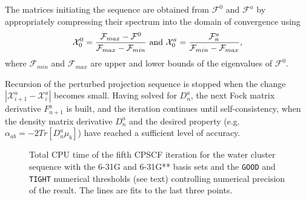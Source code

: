 \documentclass[prl,aps,twocolumn,showpacs,twocolumngrid,superbib]{revtex4}
\begin{document}
The matrices initiating the sequence are obtained from $\mathcal{F}^0$
and  $\mathcal{F}^a$ by appropriately 
compressing their spectrum into the domain of convergence \cite{ANiklasson02A} using
\begin{equation}
\mathcal{X}^0_{0}=\frac{\mathcal{F}_{max}-\mathcal{F}^0}{\mathcal{F}_{max}-\mathcal{F}_{min}}~{\rm and}~
\mathcal{X}^a_{0}=\frac{\mathcal{F}^a_{n}}{\mathcal{F}_{min}-\mathcal{F}_{max}},
\end{equation}
where $\mathcal{F}_{min}$ and $\mathcal{F}_{max}$ are upper and lower bounds of the eigenvalues of $\mathcal{F}^0$.

Recursion of the perturbed projection sequence is stopped when the change 
$\left| \mathcal{X}^a_{i+1}-\mathcal{X}^a_i \right|$ becomes small. Having solved for $D^a_n$, 
the next Fock matrix derivative $F^a_{n+1}$ is built, and the iteration continues until 
self-consistency, when the density matrix derivative $D^a_n$ and the desired property 
(e.g. $\alpha_{ab}=-2Tr[D^a_n\mu_b]$) have reached a sufficient level of accuracy.

\begin{figure}[t]
\caption{\protect  Total CPU time of the fifth CPSCF iteration for the water cluster sequence with 
         the 6-31G and 6-31G** basis sets and the {\tt GOOD} and {\tt TIGHT} numerical thresholds (see text) 
         controlling numerical precision of the result.  The lines are fits to the last three points.}\label{scaling}
\end{figure}
\end{document}
